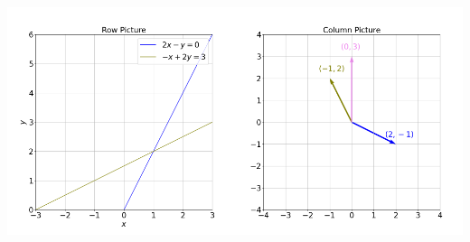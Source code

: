 \documentclass[11pt]{article}
\theoremstyle{break}
\theoremstyle{no_label}
\numberwithin{equation}{section}
\begin{document}
\begin{center}
    \includegraphics[width=0.5\textwidth]{example equation for the essense of linear algebra.png}\includegraphics[width=0.5\textwidth]{example equation as column picture.png}
\end{center}
\end{document}

